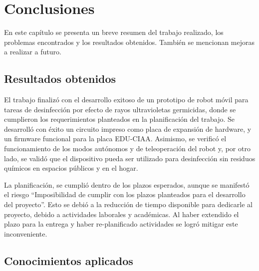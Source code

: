 
\chapter{Conclusiones} %

\label{Chapter5} %





En este capítulo se presenta un breve resumen del trabajo realizado, los problemas encontrados y los resultados obtenidos. También se mencionan mejoras a realizar a futuro.

\section{Resultados obtenidos}

El trabajo finalizó con el desarrollo exitoso de un prototipo de robot móvil para tareas de desinfección por efecto de rayos ultravioletas germicidas, donde se cumplieron los requerimientos planteados en la planificación del trabajo.
Se desarrolló con éxito un circuito impreso como placa de expansión de hardware, y un firmware funcional para la placa EDU-CIAA. Asimismo, se verificó el funcionamiento de los modos autónomos y de teleoperación del robot y, por otro lado, se validó que el dispositivo pueda ser utilizado para desinfección sin residuos químicos en espacios públicos y en el hogar.

La planificación, se cumplió dentro de los plazos esperados, aunque se manifestó el riesgo “Imposibilidad de cumplir con los plazos planteados para el desarrollo del proyecto”. Esto se debió a la reducción de tiempo disponible para dedicarle al proyecto,  debido a actividades laborales y académicas. Al haber extendido el plazo para la entrega y haber re-planificado actividades se logró mitigar este inconveniente.


\section{Conocimientos aplicados}

